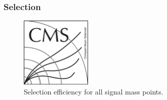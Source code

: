 \subsubsection{Selection}
\label{sec:seleff}

\begin{figure}[!Hhtbp]
  \begin{center}
    \includegraphics[width=0.3\textwidth]{figs/CMSlogo.png}
    \caption{Selection efficiency for all signal mass points.}
    \label{fig:SelEff}
  \end{center}
\end{figure}\clearpage

